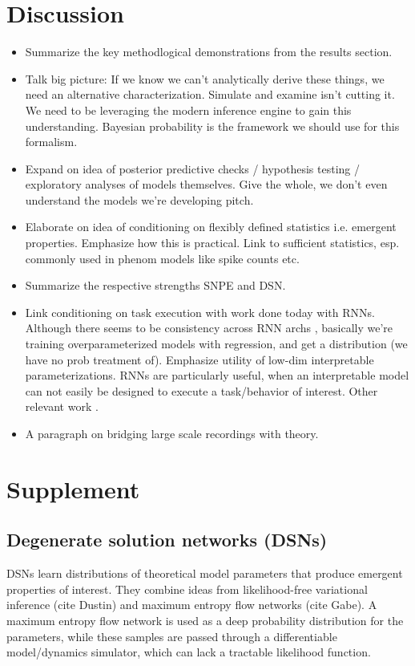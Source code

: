 \documentclass[11pt]{article}
\begin{document}
\section{Discussion}
\begin{itemize}
\item Summarize the key methodlogical demonstrations from the results section.
\item Talk big picture: If we know we can't analytically derive these things, we need an alternative characterization.  Simulate and examine isn't cutting it.  We need to be leveraging the modern inference engine to gain this understanding.  Bayesian probability is the framework we should use for this formalism.
\item Expand on idea of posterior predictive checks / hypothesis testing / exploratory analyses of models themselves.  Give the whole, we don't even understand the models we're developing pitch.
\item Elaborate on idea of conditioning on flexibly defined statistics i.e. emergent properties. Emphasize how this is practical.  Link to sufficient statistics, esp. commonly used in phenom models like spike counts etc.
\item Summarize the respective strengths SNPE and DSN.
\item Link conditioning on task execution with work done today with RNNs.  Although there seems to be consistency across RNN archs \cite{universality2019Maheswaranathan}, basically we're training overparameterized models with regression, and get a distribution (we have no prob treatment of). Emphasize utility of low-dim interpretable parameterizations. RNNs are particularly useful, when an interpretable model can not easily be designed to execute a task/behavior of interest. Other relevant work \cite{zhao2016interpretable, duncker2019learning}.
\item A paragraph on bridging large scale recordings with theory.
\end{itemize}





\appendix

\section{Supplement}

\subsection{Degenerate solution networks (DSNs)}
DSNs learn distributions of theoretical model parameters that produce emergent properties of interest.  They combine ideas from likelihood-free variational inference (cite Dustin) and maximum entropy flow networks (cite Gabe).  A maximum entropy flow network is used as a deep probability distribution for the parameters, while these samples are passed through a differentiable model/dynamics simulator, which can lack a tractable likelihood function.
\end{document}
